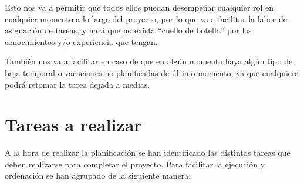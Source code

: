 \documentclass{\ClassPath/viu-tfm-template}
\begin{document}
Esto nos va a permitir que todos ellos puedan desempeñar cualquier rol en cualquier momento a lo largo del proyecto, por lo que va a facilitar la labor de asignación de tareas, y hará que no exista “cuello de botella” por los conocimientos y/o experiencia que tengan.

También nos va a facilitar en caso de que en algún momento haya algún tipo de baja temporal o vacaciones no planificadas de último momento, ya que cualquiera podrá retomar la tarea dejada a medias.


\section{Tareas a realizar}

A la hora de realizar la planificación se han identificado las distintas tareas que deben realizarse para completar el proyecto. Para facilitar la ejecución y ordenación  se han agrupado de la siguiente manera:
\end{document}
